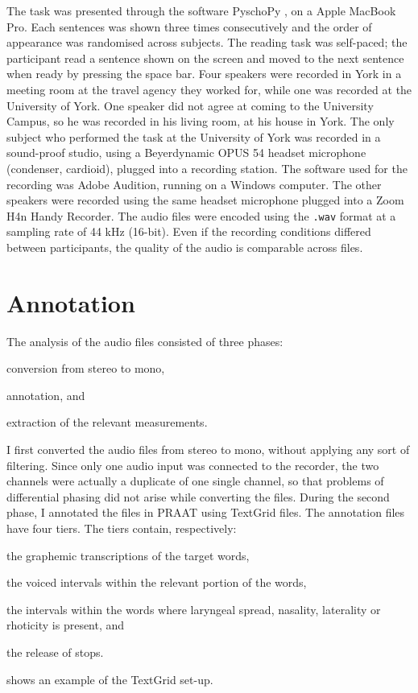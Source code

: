 \documentclass[11pt,a4paper,oneside,openany]{memoir}\usepackage[]{graphicx}\usepackage[]{color}
\begin{document}
The task was presented through the software PyschoPy \citep{peirce2009}, on a Apple MacBook Pro.
Each sentences was shown three times consecutively and the order of appearance was randomised across subjects.
The reading task was self-paced; the participant read a sentence shown on the screen and moved to the next sentence when ready by pressing the space bar.
Four speakers were recorded in York in a meeting room at the travel agency they worked for, while one was recorded at the University of York.
One speaker did not agree at coming to the University Campus, so he was recorded in his living room, at his house in York.
The only subject who performed the task at the University of York was recorded in a sound-proof studio, using a Beyerdynamic OPUS 54 headset microphone (condenser, cardioid), plugged into a recording station.
The software used for the recording was Adobe Audition, running on a Windows computer.
The other speakers were recorded using the same headset microphone plugged into a Zoom H4n Handy Recorder.
The audio files were encoded using the \texttt{.wav} format at a sampling rate of 44 kHz (16-bit).
Even if the recording conditions differed between participants, the quality of the audio is comparable across files.

\section{Annotation}
\label{s:annotation}

The analysis of the audio files consisted of three phases:
\begin{inparaenum}[(1)]
	\item conversion from stereo to mono,
	\item annotation, and
	\item extraction of the relevant measurements.
\end{inparaenum}
I first converted the audio files from stereo to mono, without applying any sort of filtering.
Since only one audio input was connected to the recorder, the two channels were actually a duplicate of one single channel, so that problems of differential phasing did not arise while converting the files.
During the second phase, I annotated the files in PRAAT \citep{boersma2015} using TextGrid files.
The annotation files have four tiers.
The tiers contain, respectively: 
\begin{inparaenum}[(1)]
	\item the graphemic transcriptions of the target words,
	\item the voiced intervals within the relevant portion of the words, 
	\item the intervals within the words where laryngeal spread, nasality, laterality or rhoticity is present, and
	\item the release of stops.
\end{inparaenum}
 shows an example of the TextGrid set-up.
\end{document}
